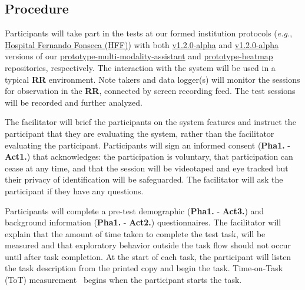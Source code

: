 

\subsection{Procedure}

Participants will take part in the tests at our formed institution protocols (\textit{e.g.}, \hyperlink{http://hff.min-saude.pt/}{Hospital Fernando Fonseca (HFF)}) with both \hyperlink{https://github.com/mida-project/prototype-multi-modality-assistant/releases/tag/v1.2.0-alpha}{v1.2.0-alpha} and \hyperlink{https://github.com/mida-project/prototype-heatmap/releases/tag/v1.2.0-alpha}{v1.2.0-alpha} versions of our \hyperlink{https://github.com/mida-project/prototype-multi-modality-assistant/}{prototype-multi-modality-assistant} and \hyperlink{https://github.com/mida-project/prototype-heatmap}{prototype-heatmap} repositories, respectively. The interaction with the system will be used in a typical \textbf{RR} environment. Note takers and data logger(s) will monitor the sessions for observation in the \textbf{RR}, connected by screen recording feed. The test sessions will be recorded and further analyzed.

The facilitator will brief the participants on the system features and instruct the participant that they are evaluating the system, rather than the facilitator evaluating the participant. Participants will sign an informed consent (\textbf{Pha1.} - \textbf{Act1.}) that acknowledges: the participation is voluntary, that participation can cease at any time, and that the session will be videotaped and eye tracked but their privacy of identification will be safeguarded. The facilitator will ask the participant if they have any questions.

\hfill

Participants will complete a pre-test demographic (\textbf{Pha1.} - \textbf{Act3.}) and background information (\textbf{Pha1.} - \textbf{Act2.}) questionnaires. The facilitator will explain that the amount of time taken to complete the test task, will be measured and that exploratory behavior outside the task flow should not occur until after task completion. At the start of each task, the participant will listen the task description from the printed copy and begin the task. Time-on-Task (ToT) measurement~\cite{reale2018using} begins when the participant starts the task.


